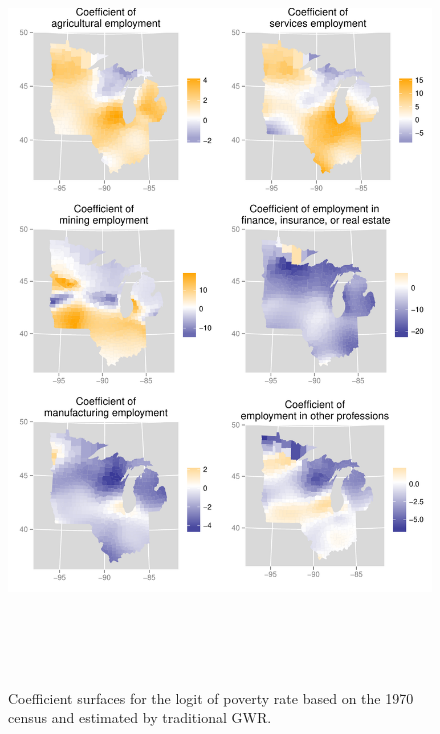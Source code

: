 \documentclass[authoryear, review, 11pt]{elsarticle}
\begin{document}
	\begin{figure}
		\begin{center}
			\includegraphics[height=8in]{../../figures/poverty/1970-GWR-coefficients}
			\caption{Coefficient surfaces for the logit of poverty rate based on the 1970 census and estimated by traditional GWR.\label{fig:gwr-coefs-1970}}
		\end{center}
	\end{figure}
\end{document}
